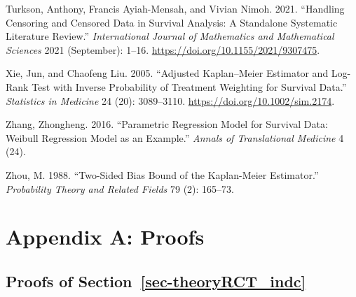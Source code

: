\documentclass[
  11pt,
  a4paper,
]{article}
\newlength{\cslhangindent}
\newenvironment{CSLReferences}[2] %
 {\begin{list}{}{%
  \setlength{\itemindent}{0pt}
  \setlength{\leftmargin}{0pt}
  \setlength{\parsep}{0pt}
  \ifodd #1
   \setlength{\leftmargin}{\cslhangindent}
   \setlength{\itemindent}{-1\cslhangindent}
  \fi
  \setlength{\itemsep}{#2\baselineskip}}}
 {\end{list}}
\theoremstyle{plain}
\theoremstyle{plain}
\theoremstyle{plain}
\theoremstyle{definition}
\theoremstyle{remark}
\begin{document}
\begin{CSLReferences}{1}{0}
Turkson, Anthony, Francis Ayiah-Mensah, and Vivian Nimoh. 2021.
{``Handling Censoring and Censored Data in Survival Analysis: A
Standalone Systematic Literature Review.''} \emph{International Journal
of Mathematics and Mathematical Sciences} 2021 (September): 1--16.
\url{https://doi.org/10.1155/2021/9307475}.

Xie, Jun, and Chaofeng Liu. 2005. {``Adjusted Kaplan--Meier Estimator
and Log-Rank Test with Inverse Probability of Treatment Weighting for
Survival Data.''} \emph{Statistics in Medicine} 24 (20): 3089--3110.
\url{https://doi.org/10.1002/sim.2174}.

Zhang, Zhongheng. 2016. {``Parametric Regression Model for Survival
Data: Weibull Regression Model as an Example.''} \emph{Annals of
Translational Medicine} 4 (24).

Zhou, M. 1988. {``Two-Sided Bias Bound of the Kaplan-Meier Estimator.''}
\emph{Probability Theory and Related Fields} 79 (2): 165--73.

\end{CSLReferences}

\section{Appendix A: Proofs}\label{appendix-a-proofs}

\subsection{\texorpdfstring{Proofs of
Section~\ref{sec-theoryRCT_indc}}{Proofs of Section~}}\label{sec-proof21}
\end{document}

